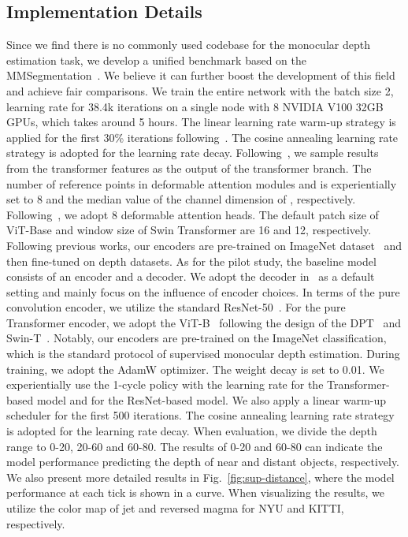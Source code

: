\documentclass[twocolumn]{svjour3}    \pdfoutput=1
\begin{document}
\subsection{Implementation Details}
Since we find there is no commonly used codebase for the monocular depth estimation task, we develop a unified benchmark based on the MMSegmentation~\citep{mmseg2020}. We believe it can further boost the development of this field and achieve fair comparisons. We train the entire network with the batch size 2, learning rate  for 38.4k iterations on a single node with 8 NVIDIA V100 32GB GPUs, which takes around 5 hours. The linear learning rate warm-up strategy is applied for the first 30\% iterations following~\citep{bhat2021adabins}. The cosine annealing learning rate strategy is adopted for the learning rate decay. Following~\citep{ranftl2021dpt, liu2021swin}, we sample  results from the transformer features as the output of the transformer branch. The number of reference points in deformable attention modules and  is experientially set to 8 and the median value of the channel dimension of , respectively. Following~\citep{zhu2020deformabledetr}, we adopt 8 deformable attention heads. The default patch size of ViT-Base and window size of Swin Transformer are 16 and 12, respectively. Following previous works, our encoders are pre-trained on ImageNet dataset~\citep{krizhevsky2012imagenet} and then fine-tuned on depth datasets. As for the pilot study, the baseline model consists of an encoder and a decoder. We adopt the decoder in~\citep{alhashim2018densedepth} as a default setting and mainly focus on the influence of encoder choices. In terms of the pure convolution encoder, we utilize the standard ResNet-50~\citep{he2016resenet}. For the pure Transformer encoder, we adopt the ViT-B~\citep{dosovitskiy2020vit} following the design of the DPT~\citep{ranftl2021dpt} and Swin-T~\citep{liu2021swin}. Notably, our encoders are pre-trained on the ImageNet classification, which is the standard protocol of supervised monocular depth estimation. During training, we adopt the AdamW optimizer. The weight decay is set to 0.01. We experientially use the 1-cycle policy with the learning rate  for the Transformer-based model and  for the ResNet-based model. We also apply a linear warm-up scheduler for the first 500 iterations. The cosine annealing learning rate strategy is adopted for the learning rate decay. When evaluation, we divide the depth range to 0-20, 20-60 and 60-80. The results of 0-20 and 60-80 can indicate the model performance predicting the depth of near and distant objects, respectively. We also present more detailed results in Fig.~\ref{fig:sup-distance}, where the model performance at each tick is shown in a curve. When visualizing the results, we utilize the color map of jet and reversed magma for NYU and KITTI, respectively.
\end{document}
